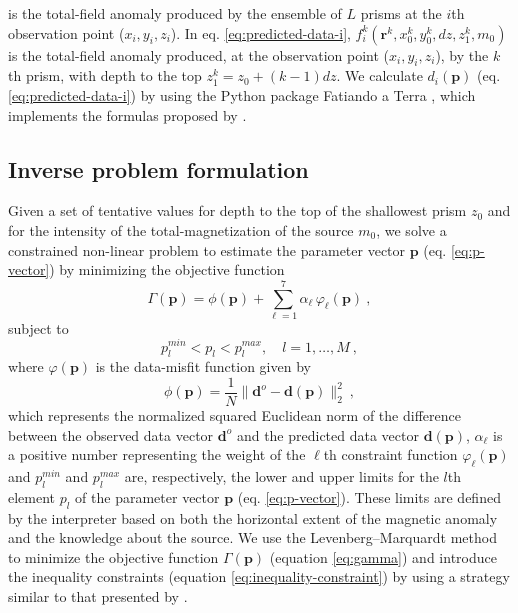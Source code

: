 is the total-field anomaly produced by the ensemble of $L$ prisms at the $i$th observation point ($x_{i}, y_{i}, z_{i}$). 
In eq. \ref{eq:predicted-data-i}, $f_{i}^{k}(\mathbf{r}^{k}, x_{0}^{k}, y_{0}^{k}, dz, z_{1}^{k}, m_{0})$ is the total-field anomaly 
produced, at the observation point ($x_{i}, y_{i}, z_{i}$), by the $k$th prism, with depth to the top $z_{1}^{k} = z_{0} + (k-1)dz$.
We calculate $d_{i} (\mathbf{p})$ (eq. \ref{eq:predicted-data-i}) by using the Python package Fatiando a Terra \citep{uieda-etal2013}, 
which implements the formulas proposed by \cite{plouff1976}.

\subsection{Inverse problem formulation}

Given a set of tentative values for depth to the top of the shallowest prism $z_{0}$ and for the intensity of the 
total-magnetization of the source $m_{0}$, we solve a constrained non-linear problem to estimate the parameter 
vector $\mathbf{p}$ (eq. \ref{eq:p-vector}) by minimizing the objective function
\begin{equation}
\Gamma (\mathbf{p}) = \phi (\mathbf{p}) + \sum\limits^{7}_{\ell =1} \alpha_{\ell} \, \varphi_{\ell}(\mathbf{p}) \: ,
\label{eq:gamma}
\end{equation}
subject to
\begin{equation}
p_{l}^{min} < p_{l} < p_{l}^{max}, \quad l = 1, \dots, M \: ,
\label{eq:inequality-constraint}
\end{equation}
where $\varphi (\mathbf{p})$ is the data-misfit function given by
\begin{equation}\label{eq:misfit}
\phi (\mathbf{p}) = \frac{1}{N} \| \mathbf{d}^{o} - \mathbf{d}(\mathbf{p}) \|_{2}^{2} \: ,
\end{equation}
which represents the normalized squared Euclidean norm of the difference between the observed data vector $\mathbf{d}^{o}$ and 
the predicted data vector $\mathbf{d}(\mathbf{p})$, $\alpha_{\ell}$ is a positive number representing the weight of the 
$\ell$th constraint function $\varphi_{\ell}(\mathbf{p})$ and $p_{l}^{min}$ and $p_{l}^{max}$ are, respectively, the lower and 
upper limits for the $l$th element $p_{l}$ of the parameter vector $\mathbf{p}$ (eq. \ref{eq:p-vector}). 
These limits are defined by the interpreter based on both the horizontal extent of the magnetic anomaly and the knowledge 
about the source.
We use the Levenberg–Marquardt method \citep[][ p. 240]{aster-etal2019} to minimize the objective function 
$\Gamma (\mathbf{p})$ (equation \ref{eq:gamma}) and introduce the inequality constraints 
(equation \ref{eq:inequality-constraint}) by using a strategy similar to that presented by \citet{barbosa-etal1999}.

